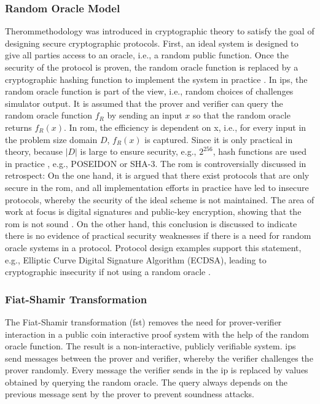 \subsubsection{Random Oracle Model}
The\acrshort{rom}methodology was introduced in cryptographic theory to satisfy the goal of designing secure cryptographic protocols. First, an ideal system is designed to give all parties access to an oracle, i.e., a random public function. Once the security of the protocol is proven, the random oracle function is replaced by a cryptographic hashing function to implement the system in practice \citep{ROMBellare}. In \acrshort{ip}s, the random oracle function is part of the view, i.e., random choices of challenges simulator output. It is assumed that the prover and verifier can query the random oracle function \(f_R\) by sending an input \(x\) so that the random oracle returns \(f_R(x)\). In \acrshort{rom}, the efficiency is dependent on x, i.e., for every input in the problem size domain \(D\), \(f_R(x)\) is captured. Since it is only practical in theory, because \(|D|\) is large to ensure security, e.g., \(2^{256}\), hash functions are used in practice \citep{ROMBellare, Thaler}, e.g., POSEIDON or SHA-3. The \acrshort{rom} is controversially discussed in retrospect: On the one hand, it is argued that there exist protocols that are only secure in the \acrshort{rom}, and all implementation efforts in practice have led to insecure protocols, whereby the security of the ideal scheme is not maintained. The area of work at focus is digital signatures and public-key encryption, showing that the \acrshort{rom} is not sound \citep{ROMCanetti}. On the other hand, this conclusion is discussed to indicate there is no evidence of practical security weaknesses if there is a need for random oracle systems in a protocol. Protocol design examples support this statement, e.g., Elliptic Curve Digital Signature Algorithm (ECDSA), leading to cryptographic insecurity if not using a random oracle \citep{ROMretroKoblitz}. 
\subsubsection{Fiat-Shamir Transformation}
The Fiat-Shamir transformation (\acrshort{fst}) \citep{ROMFiat1986HowTP} removes the need for prover-verifier interaction in a public coin interactive proof system with the help of the random oracle function. The result is a non-interactive, publicly verifiable system. \acrshort{ip}s send messages between the prover and verifier, whereby the verifier challenges the prover randomly. Every message the verifier sends in the \acrshort{ip} is replaced by values obtained by querying the random oracle. The query always depends on the previous message sent by the prover to prevent soundness attacks.

